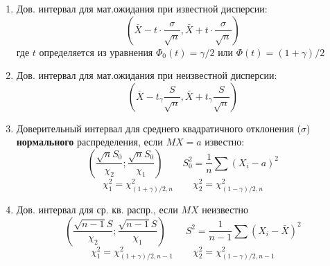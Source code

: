 \documentclass{article}
\begin{document}
\begin{multicols}{2}
    \begin{enumerate}
      \item Дов. интервал для мат.ожидания при известной дисперсии:
        \[
          \left(\bar X - t \cdot \frac{\sigma}{\sqrt{n}}, \bar X + t \cdot \frac{\sigma}{\sqrt{n}}\right)
          \]
        где $t$ определяется из уравнения $\Phi_0(t) = \gamma/2$ или $\Phi(t) = (1+\gamma)/2$
      \item Дов. интервал для мат.ожидания при неизвестной дисперсии:
        \[
          \left( \bar X - t_\gamma \frac{S}{\sqrt{n}}, \bar X + t_\gamma \frac{S}{\sqrt{n}} \right)
        \]
      \item Доверительный интервал для среднего квадратичного отклонения ($\sigma$)
        \textbf{нормального} распределения, если $MX = a$ известно:
        \[
          \left(\frac{\sqrt{n} S_0}{\chi_2}; \frac{\sqrt{n} S_0}{\chi_1}\right)
          \qquad
          S_0^2 = \frac{1}{n} \sum (X_i - a)^2 
        \]
        \[
          \chi_1^2 = \chi^2_{(1+\gamma)/2,n}
          \qquad
          \chi_2^2 = \chi^2_{(1-\gamma)/2,n}
        \]
      \item Дов. интервал для ср. кв. распр., если $MX$ неизвестно
        \[
          \left(\frac{\sqrt{n-1} S}{\chi_2}; \frac{\sqrt{n-1} S}{\chi_1} \right)
          \qquad
          S^2 = \frac{1}{n-1} \sum (X_i - \bar X)^2
        \]
        \[
          \chi_1^2 = \chi^2_{(1+\gamma)/2,n-1}
          \qquad
          \chi_2^2 = \chi^2_{(1-\gamma)/2,n-1}
        \]

    \end{enumerate}
\end{multicols}
\end{document}
